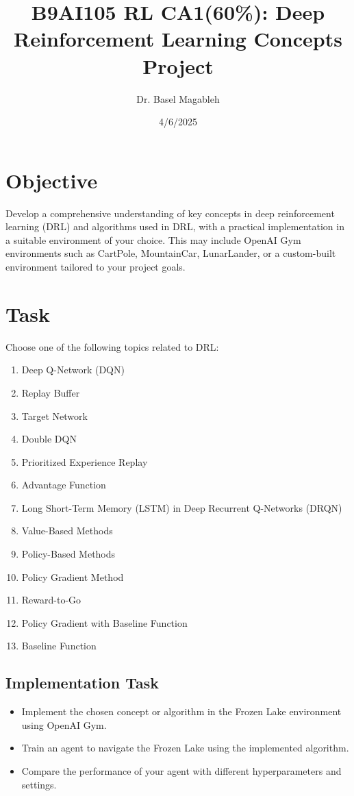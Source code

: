 \documentclass{article}
\title{B9AI105 RL CA1(60\%): Deep Reinforcement Learning Concepts Project}
\author{Dr. Basel Magableh}
\date{4/6/2025}
\begin{document}
\maketitle

\section*{Objective}
Develop a comprehensive understanding of key concepts in deep reinforcement learning (DRL) and algorithms used in DRL, with a practical implementation in a suitable environment of your choice. This may include OpenAI Gym environments such as CartPole, MountainCar, LunarLander, or a custom-built environment tailored to your project goals.

\section*{Task}
Choose one of the following topics related to DRL:
\begin{enumerate}[label=\arabic*.]
    \item Deep Q-Network (DQN)
    \item Replay Buffer
    \item Target Network
    \item Double DQN
    \item Prioritized Experience Replay
    \item Advantage Function
    \item Long Short-Term Memory (LSTM) in Deep Recurrent Q-Networks (DRQN)
    \item Value-Based Methods
    \item Policy-Based Methods
    \item Policy Gradient Method
    \item Reward-to-Go
    \item Policy Gradient with Baseline Function
    \item Baseline Function
\end{enumerate}

\subsection*{Implementation Task}
\begin{itemize}
    \item Implement the chosen concept or algorithm in the Frozen Lake environment using OpenAI Gym.
    \item Train an agent to navigate the Frozen Lake using the implemented algorithm.
    \item Compare the performance of your agent with different hyperparameters and settings.
\end{itemize}
\end{document}
